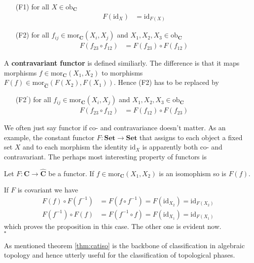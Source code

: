 \begin{enumerate}
\item[(F1)]
for all $X \in \mathrm{ob}_{\mathbf{C}}$
\begin{align*}
  F(\mathrm{id}_{X})
  &=
  \mathrm{id}_{F(X)}
\end{align*}
\item[(F2)]
for all $f_{ij} \in \mathrm{mor}_{\mathbf{C}}(X_{i},X_{j})$ and $X_{1},X_{2},X_{3} \in \mathrm{ob}_{\mathbf{C}}$
\begin{align*}
  F(f_{23} \circ f_{12})
  &=
  F(f_{23})
  \circ
  F(f_{12}) 
\end{align*}
\end{enumerate}
A \textbf{contravariant functor} is defined similiarly. The difference is that it maps morphisms $f \in \mathrm{mor}_{\mathbf{C}}(X_{1},X_{2})$ to morphisms $F(f) \in \mathrm{mor}_{\hat{\mathbf{C}}}(F(X_{2}),F(X_{1}))$. Hence (F2) has to be replaced by
\begin{enumerate}
\item[(F2$^{\prime}$)]
for all $f_{ij} \in \mathrm{mor}_{\mathbf{C}}(X_{i},X_{j})$ and $X_{1},X_{2},X_{3} \in \mathrm{ob}_{\mathbf{C}}$
\begin{align*}
  F(f_{23} \circ f_{12})
  &=
  F(f_{12})
  \circ
  F(f_{23}) 
\end{align*}
\end{enumerate}
We often just say functor if co- and contravariance doesn't matter. As an example, the constant functor $F \colon \mathbf{Set} \to \mathbf{Set}$ that assigns to each object a fixed set $X$ and to each morphism the identity $\mathrm{id}_{X}$ is apparently both co- and contravariant. The perhaps most interesting property of functors is
\\
\begin{thm}
\label{thm:catiso}
Let $F \colon \mathbf{C} \to \hat{\mathbf{C}}$ be a functor. If $f \in \mathrm{mor}_{\mathbf{C}}(X_{1},X_{2})$ is an isomophism so is $F(f)$.
\end{thm}
\begin{prf}
If $F$ is covariant we have
\begin{align*}
  F(f)
  \circ
  F(f^{-1})
  &=
  F(f \circ f^{-1})
  =
  F(\mathrm{id}_{X_{2}})
  =
  \mathrm{id}_{F(X_{2})}
  \\
  F(f^{-1})
  \circ
  F(f)
  &=
  F(f^{-1} \circ f)
  =
  F(\mathrm{id}_{X_{1}})
  =
  \mathrm{id}_{F(X_{1})}
\end{align*}
which proves the proposition in this case. The other one is evident now.
\\
\phantom{proven}
\hfill
$\square$
\end{prf}
As mentioned theorem \ref{thm:catiso} is the backbone of classification in algebraic topology and hence utterly useful for the classification of topological phases.
